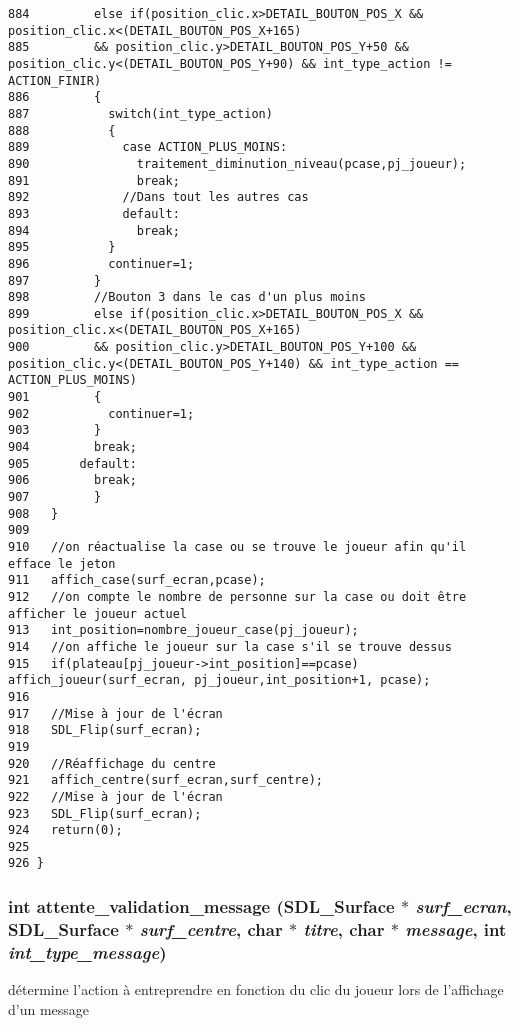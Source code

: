 \begin{Code}
\begin{verbatim}
884         else if(position_clic.x>DETAIL_BOUTON_POS_X && position_clic.x<(DETAIL_BOUTON_POS_X+165)
885         && position_clic.y>DETAIL_BOUTON_POS_Y+50 && position_clic.y<(DETAIL_BOUTON_POS_Y+90) && int_type_action != ACTION_FINIR)
886         {
887           switch(int_type_action)
888           {
889             case ACTION_PLUS_MOINS:
890               traitement_diminution_niveau(pcase,pj_joueur);
891               break;
892             //Dans tout les autres cas
893             default:
894               break;
895           }
896           continuer=1;
897         }
898         //Bouton 3 dans le cas d'un plus moins
899         else if(position_clic.x>DETAIL_BOUTON_POS_X && position_clic.x<(DETAIL_BOUTON_POS_X+165)
900         && position_clic.y>DETAIL_BOUTON_POS_Y+100 && position_clic.y<(DETAIL_BOUTON_POS_Y+140) && int_type_action == ACTION_PLUS_MOINS)
901         {
902           continuer=1;
903         }
904         break;
905       default:
906         break;
907         }
908   }
909   
910   //on réactualise la case ou se trouve le joueur afin qu'il efface le jeton
911   affich_case(surf_ecran,pcase);
912   //on compte le nombre de personne sur la case ou doit être afficher le joueur actuel
913   int_position=nombre_joueur_case(pj_joueur);
914   //on affiche le joueur sur la case s'il se trouve dessus
915   if(plateau[pj_joueur->int_position]==pcase) affich_joueur(surf_ecran, pj_joueur,int_position+1, pcase);
916   
917   //Mise à jour de l'écran
918   SDL_Flip(surf_ecran);
919   
920   //Réaffichage du centre
921   affich_centre(surf_ecran,surf_centre);
922   //Mise à jour de l'écran
923   SDL_Flip(surf_ecran);
924   return(0);
925   
926 }
\end{verbatim}\end{Code}


\subsubsection{\setlength{\rightskip}{0pt plus 5cm}int attente\_\-validation\_\-message (SDL\_\-Surface $\ast$ {\em surf\_\-ecran}, SDL\_\-Surface $\ast$ {\em surf\_\-centre}, char $\ast$ {\em titre}, char $\ast$ {\em message}, int {\em int\_\-type\_\-message})}\label{interaction_8h_232bfa13a7e55819d63a9cc0d6e475ac}


d\'{e}termine l'action \`{a} entreprendre en fonction du clic du joueur lors de l'affichage d'un message 

